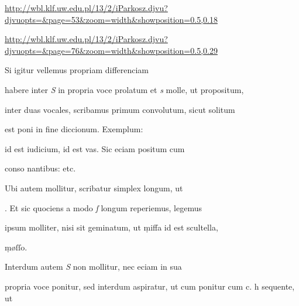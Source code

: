 
\newParkoszpage

{
\url{http://wbl.klf.uw.edu.pl/13/2/iParkosz.djvu?djvuopts=&page=53&zoom=width&showposition=0.5,0.18}

\url{http://wbl.klf.uw.edu.pl/13/2/iParkosz.djvu?djvuopts=&page=76&zoom=width&showposition=0.5,0.29}
}

\bigskip

\obeylines
\mono



\fullpreviouslines


{
\color{blue}



\indentK Si igitur vellemus propriam differenciam

\fulllines

habere inter \textit{S} in propria voce prolatum et \textit{s} molle, ut propositum,
}


\fulllines

inter duas vocales, scribamus primum convolutum, sicut solitum

est poni in fine diccionum. Exemplum:   

 id est iudicium,  id est vas. Sic eciam positum cum

conso nantibus:      etc.

Ubi autem mollitur, scribatur simplex longum, ut 

. Et sic quociens a modo \textit{ſ} longum reperiemus, legemus

ipsum molliter, nisi sit geminatum, ut ṃiﬀa id est scultella,

\splitlines

ṃøſſo.

\indentK Interdum autem \textit{S} non mollitur, nec eciam in sua

\fulllines

propria voce ponitur, sed interdum aspiratur, ut cum ponitur cum
 c. h sequente, ut   

\splitlines

